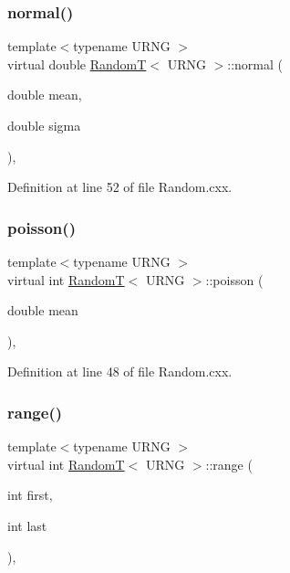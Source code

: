 \subsubsection{\texorpdfstring{normal()}{normal()}}
{\footnotesize\ttfamily template$<$typename U\+R\+NG $>$ \\
virtual double \hyperlink{class_random_t}{RandomT}$<$ U\+R\+NG $>$\+::normal (\begin{DoxyParamCaption}\item[{double}]{mean,  }\item[{double}]{sigma }\end{DoxyParamCaption})\hspace{0.3cm}{\ttfamily [inline]}, {\ttfamily [virtual]}}



Definition at line 52 of file Random.\+cxx.

\mbox{\label{class_random_t_ab8c7ac8421629f54a240842e5c86b4a4}} 
\subsubsection{\texorpdfstring{poisson()}{poisson()}}
{\footnotesize\ttfamily template$<$typename U\+R\+NG $>$ \\
virtual int \hyperlink{class_random_t}{RandomT}$<$ U\+R\+NG $>$\+::poisson (\begin{DoxyParamCaption}\item[{double}]{mean }\end{DoxyParamCaption})\hspace{0.3cm}{\ttfamily [inline]}, {\ttfamily [virtual]}}



Definition at line 48 of file Random.\+cxx.

\mbox{\label{class_random_t_a2c8bd74ddb85c405a5bc2be6f9edab55}} 
\subsubsection{\texorpdfstring{range()}{range()}}
{\footnotesize\ttfamily template$<$typename U\+R\+NG $>$ \\
virtual int \hyperlink{class_random_t}{RandomT}$<$ U\+R\+NG $>$\+::range (\begin{DoxyParamCaption}\item[{int}]{first,  }\item[{int}]{last }\end{DoxyParamCaption})\hspace{0.3cm}{\ttfamily [inline]}, {\ttfamily [virtual]}}



